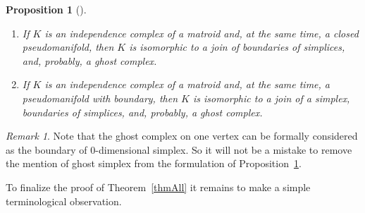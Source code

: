 \documentclass[english,12pt,oneside]{amsproc}
\newcounter{stmcounter}[section]
\numberwithin{equation}{section}
\theoremstyle{plain}
\newtheorem{prop}[stmcounter]{Proposition}
\theoremstyle{definition}
\theoremstyle{remark}
\newtheorem{rem}[stmcounter]{Remark}
\begin{document}
\begin{prop}[\cite{BilProv}]\label{propBillProv}\mbox{}
\begin{enumerate}
  \item If $K$ is an independence complex of a matroid and, at the same time, a closed pseudomanifold, then $K$ is isomorphic to a join of boundaries of simplices, and, probably, a ghost complex.
  \item If $K$ is an independence complex of a matroid and, at the same time, a pseudomanifold with boundary, then $K$ is isomorphic to a join of a simplex, boundaries of simplices, and, probably, a ghost complex.
\end{enumerate}
\end{prop}

\begin{rem}\label{remGhostIsComplexityOne}
Note that the ghost complex on one vertex can be formally considered as the boundary of 0-dimensional simplex. So it will not be a mistake to remove the mention of ghost simplex from the formulation of Proposition~\ref{propBillProv}.
\end{rem}

To finalize the proof of Theorem~\ref{thmAll} it remains to make a simple terminological observation.
\end{document}
